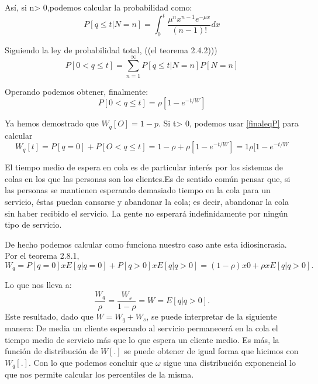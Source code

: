 \documentclass[a4paper,10pt]{scrartcl}
\theoremstyle{definition}
\numberwithin{equation}{section}
\begin{document}
Así, si n> 0,podemos calcular la probabilidad como:
\begin{equation*}
  P[q\leq t|N=n]=\int_{0}^{t}\frac{\mu^nx^{n-1}e^{-\mu x}}{(n-1)!}dx
\end{equation*}

Siguiendo la ley de probabilidad total, ((el teorema 2.4.2)))
\begin{equation*}
  P[0<q\leq t]=\sum_{n=1}^{\infty}P[q\leq t|N=n]P[N=n]
\end{equation*}

Operando podemos obtener, finalmente:
\begin{equation*}
  P[0<q\leq t]=\rho[1-e^{-t/W}]
\label{finaleqP}
\end{equation*}


Ya hemos demostrado que $W_q [O] = 1 - p$. Si t> 0, podemos usar \ref{finaleqP} para calcular 
\[W_q [t]=P [q = 0] + P [O <q \leq t]= 1 - \rho + \rho [1 - e^{- t / W}]=1\rho[1-e^{-t/W}\]

El tiempo medio de espera en cola es de particular interés por los sistemas de colas en los que las personas son los clientes.Es de sentido común pensar que, si las personas se mantienen esperando demasiado tiempo en la cola para un servicio, éstas puedan cansarse y abandonar la cola; es decir, abandonar la cola sin haber recibido el servicio. La gente no esperará indefinidamente por ningún tipo de servicio.

De hecho podemos calcular como funciona nuestro caso ante esta idiosincrasia. Por el teorema 2.8.1,
\begin{equation*}
  W_q = P [q = 0] x E [q|q = 0] + P [q> 0] x E [q|q> 0] = (1 - \rho) x 0 + \rho x E [q|q> 0].
\end{equation*}

Lo que nos lleva a:
\begin{equation*}
\frac{W_q}{\rho}=\frac{W_s}{1-\rho}=W= E [q|q> 0].
\end{equation*}
Este resultado, dado que $W=W_q+W_s$, se puede interpretar de la siguiente manera: De media un cliente esperando al servicio permanecerá en la cola el tiempo medio de servicio más que lo que espera un cliente medio.
Es más, la función de distribución de $W[.]$ se puede obtener de igual forma que hicimos con $W_q[.]$. Con lo que podemos concluir que $\omega$ sigue una distribución exponencial lo que nos permite calcular los percentiles de la misma.
\end{document}
